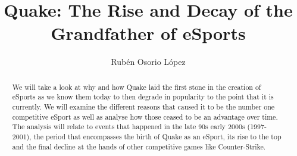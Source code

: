 \documentclass[twocolumn]{article}
\title{Quake: The Rise and Decay of the Grandfather of eSports}
\author{Rubén Osorio López}
\begin{document}
\maketitle

\begin{abstract}

We will take a look at why and how Quake laid the first stone in the creation of eSports as we know them today to then degrade in popularity to the point that it is currently. We will examine the different reasons that caused it to be the number one competitive eSport as well as analyse how those ceased to be an advantage over time. The analysis will relate to events that happened in the late 90s early 2000s (1997-2001), the period that encompasses the birth of Quake as an eSport, its rise to the top and the final decline at the hands of other competitive games like Counter-Strike.

\end{abstract}







\nocite{*} %





\listoftodos
{}
\end{document}
